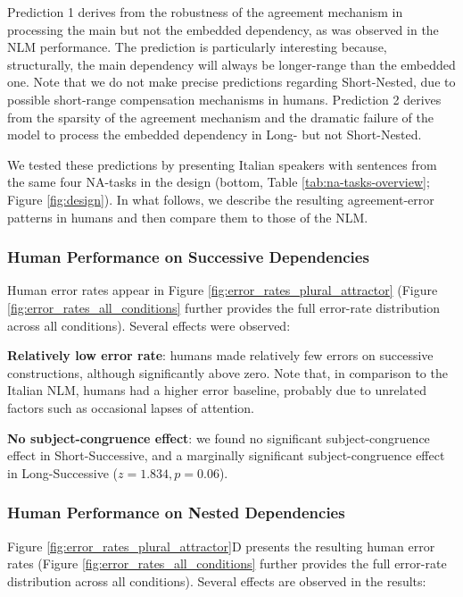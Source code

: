 Prediction 1 derives from the robustness of the agreement mechanism in processing the main but not the embedded dependency, as was observed in the NLM performance. The prediction is particularly interesting because, structurally, the main dependency will always be longer-range than the embedded one. Note that we do not make precise predictions regarding Short-Nested, due to possible short-range compensation mechanisms in humans. Prediction 2 derives from the sparsity of the agreement mechanism and the dramatic failure of the model to process the embedded dependency in Long- but not Short-Nested. 

We tested these predictions by presenting Italian speakers with sentences from the same four NA-tasks in the design (bottom, Table \ref{tab:na-tasks-overview}; Figure \ref{fig:design}). In what follows, we describe the resulting agreement-error patterns in humans and then compare them to those of the NLM.

\subsubsection{Human Performance on Successive Dependencies}
Human error rates appear in Figure \ref{fig:error_rates_plural_attractor}  (Figure \ref{fig:error_rates_all_conditions} further provides the full error-rate distribution across all conditions). Several effects were observed: 

\begin{APAitemize}
    \item \textbf{Relatively low error rate}: humans made relatively few errors on successive constructions, although significantly above zero. Note that, in comparison to the Italian NLM, humans had a higher error baseline, probably due to unrelated factors such as occasional lapses of attention.
    \item \textbf{No subject-congruence effect}: we found no significant subject-congruence effect in Short-Successive, and a marginally significant subject-congruence effect in Long-Successive ($z=1.834, p=0.06$).
\end{APAitemize}

\subsubsection{Human Performance on Nested Dependencies}
Figure \ref{fig:error_rates_plural_attractor}D presents the resulting human error rates (Figure \ref{fig:error_rates_all_conditions} further provides the full error-rate distribution across all conditions). Several effects are observed in the results:

